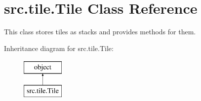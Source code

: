 \hypertarget{classsrc_1_1tile_1_1_tile}{}\section{src.\+tile.\+Tile Class Reference}
\label{classsrc_1_1tile_1_1_tile}


This class stores tiles as stacks and provides methods for them.  


Inheritance diagram for src.\+tile.\+Tile\+:\begin{figure}[H]
\begin{center}
\leavevmode
\includegraphics[height=2.000000cm]{classsrc_1_1tile_1_1_tile}
\end{center}
\end{figure}
